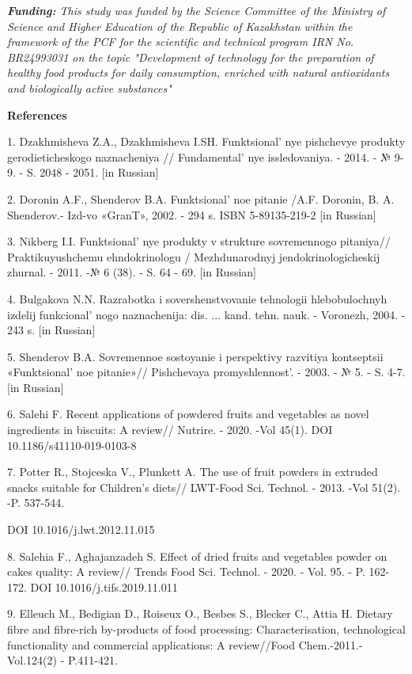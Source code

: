 \emph{{\bfseries Funding:} This study was funded by the Science Committee
of the Ministry of Science and Higher Education of the Republic of
Kazakhstan within the framework of the PCF for the scientific and
technical program IRN No. BR24993031 on the topic "Development of
technology for the preparation of healthy food products for daily
consumption, enriched with natural antioxidants and biologically active
substances"}

{\bfseries References}

1. Dzakhmisheva Z.A., Dzakhmisheva I.SH. Funktsional' nye
pishchevye produkty gerodieticheskogo naznacheniya //
Fundamental' nye issledovaniya. - 2014. - № 9-9. - S.
2048 - 2051. {[}in Russian{]}

2. Doronin A.F., Shenderov B.A. Funktsional' noe pitanie
/A.F. Doronin, B. A. Shenderov.- Izd-vo «GranT», 2002. - 294 s. ISBN
5-89135-219-2 {[}in Russian{]}

3. Nikberg I.I. Funktsional' nye produkty v strukture
sovremennogo pitaniya// Praktikuyushchemu ehndokrinologu /
Mezhdunarodnyj jendokrinologicheskij zhurnal. - 2011. -№ 6 (38). - S. 64
- 69. {[}in Russian{]}

4. Bulgakova N.N. Razrabotka i sovershenstvovanie tehnologii
hlebobulochnyh izdelij funkcional' nogo naznachenija:
dis. ... kand. tehn. nauk. - Voronezh, 2004. - 243 s. {[}in Russian{]}

5. Shenderov B.A. Sovremennoe sostoyanie i perspektivy razvitiya
kontseptsii «Funktsional' noe pitanie»// Pishchevaya
promyshlennost'. - 2003. - № 5. - S. 4-7. {[}in
Russian{]}

6. Salehi F. Recent applications of powdered fruits and vegetables as
novel ingredients in biscuits: A review// Nutrire. - 2020. -Vol 45(1).
DOI 10.1186/s41110-019-0103-8

7. Potter R., Stojceska V., Plunkett A. The use of fruit powders in
extruded snacks suitable for Children's diets// LWT-Food Sci. Technol. -
2013. -Vol 51(2). -P. 537-544.

DOI 10.1016/j.lwt.2012.11.015

8. Salehia F., Aghajanzadeh S. Effect of dried fruits and vegetables
powder on cakes quality: A review// Trends Food Sci. Technol. - 2020. -
Vol. 95. - P. 162-172. DOI 10.1016/j.tifs.2019.11.011

9. Elleuch M., Bedigian D., Roiseux O., Besbes S., Blecker C., Attia H.
Dietary ﬁbre and ﬁbre-rich by-products of food processing:
Characterisation, technological functionality and commercial
applications: A review//Food Chem.-2011.-Vol.124(2) - P.411-421.

